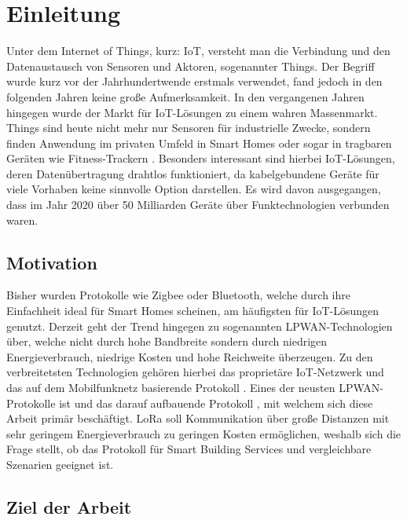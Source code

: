 \chapter{Einleitung}
\label{cha:Einleitung}

Unter dem Internet of Things, kurz: IoT, versteht man die Verbindung und den Datenaustausch von Sensoren und Aktoren, sogenannter Things. Der Begriff wurde kurz vor der Jahrhundertwende erstmals verwendet, fand jedoch in den folgenden Jahren keine große Aufmerksamkeit. In den vergangenen Jahren hingegen wurde der Markt für IoT-Lösungen zu einem wahren Massenmarkt. Things sind heute nicht mehr nur Sensoren für industrielle Zwecke, sondern finden Anwendung im privaten Umfeld in Smart Homes oder sogar in tragbaren Geräten wie Fitness-Trackern . Besonders interessant sind hierbei IoT-Lösungen, deren Datenübertragung drahtlos funktioniert, da kabelgebundene Geräte für viele Vorhaben keine sinnvolle Option darstellen. Es wird davon ausgegangen, dass im Jahr 2020 über 50 Milliarden Geräte über Funktechnologien verbunden waren.

\section{Motivation}
\label{sec:Einl:Motivation}

Bisher wurden Protokolle wie Zigbee oder Bluetooth, welche durch ihre Einfachheit ideal für Smart Homes scheinen, am häufigsten für IoT-Lösungen genutzt. Derzeit geht der Trend hingegen zu sogenannten LPWAN-Technologien über, welche nicht durch hohe Bandbreite sondern durch niedrigen Energieverbrauch, niedrige Kosten und hohe Reichweite überzeugen. Zu den verbreitetsten Technologien gehören hierbei das proprietäre IoT-Netzwerk  und das auf dem Mobilfunknetz basierende Protokoll  . Eines der neusten LPWAN-Protokolle ist  und das darauf aufbauende Protokoll , mit welchem sich diese Arbeit primär beschäftigt. LoRa soll Kommunikation über große Distanzen mit sehr geringem Energieverbrauch zu geringen Kosten ermöglichen, weshalb sich die Frage stellt, ob das Protokoll für Smart Building Services und vergleichbare Szenarien geeignet ist. 


\section{Ziel der Arbeit}
\label{sec:Einl:Ziel_der_Arbeit}

